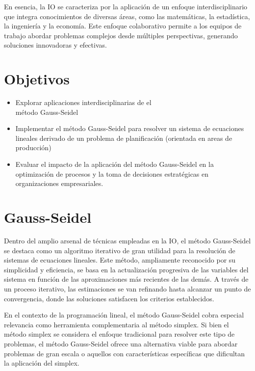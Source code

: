 \documentclass[conference]{IEEEtran}
\begin{document}
En esencia, la IO se caracteriza por la aplicación de un enfoque
interdisciplinario que integra conocimientos de diversas áreas, como
las matemáticas, la estadística, la ingeniería y la economía. Este
enfoque colaborativo permite a los equipos de trabajo abordar problemas
complejos desde múltiples perspectivas, generando soluciones innovadoras
y efectivas.

\section{Objetivos}

\begin{itemize}
    \item Explorar aplicaciones interdisciplinarias de el \\ método Gauss-Seidel
    \item Implementar el método Gauss-Seidel para resolver un sistema de
          ecuaciones lineales derivado de un problema de planificación
          (orientada en areas de producción)
    \item Evaluar el impacto de la aplicación del método Gauss-Seidel en la
          optimización de procesos y la toma de decisiones estratégicas en
          organizaciones empresariales.
\end{itemize}

\section{Gauss-Seidel}

Dentro del amplio arsenal de técnicas empleadas en la IO, el método
Gauss-Seidel se destaca como un algoritmo iterativo de gran utilidad para
la resolución de sistemas de ecuaciones lineales. Este método, ampliamente
reconocido por su simplicidad y eficiencia, se basa en la actualización
progresiva de las variables del sistema en función de las aproximaciones
más recientes de las demás. A través de un proceso iterativo, las
estimaciones se van refinando hasta alcanzar un punto de convergencia, donde
las soluciones satisfacen los criterios establecidos.

En el contexto de la programación lineal, el método Gauss-Seidel cobra
especial relevancia como herramienta complementaria al método simplex. Si
bien el método simplex se considera el enfoque tradicional para resolver
este tipo de problemas, el método Gauss-Seidel ofrece una alternativa viable
para abordar problemas de gran escala o aquellos con características
específicas que dificultan la aplicación del simplex.
\end{document}
